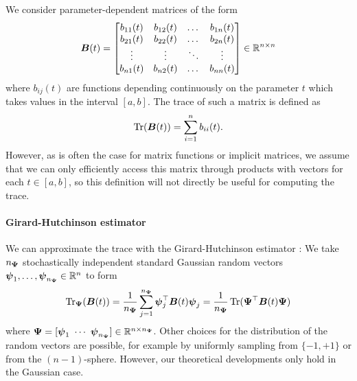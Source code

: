 \documentclass[12pt]{article}
\begin{document}
We consider parameter-dependent matrices of the form
\begin{equation}
    \boldsymbol{B}(t) = \begin{bmatrix}
        b_{11}(t) & b_{12}(t) & \dots & b_{1n}(t) \\
        b_{21}(t) & b_{22}(t) & \dots & b_{2n}(t) \\
        \vdots & \vdots & \ddots & \vdots \\
        b_{n1}(t) & b_{n2}(t) & \dots & b_{nn}(t) \\
    \end{bmatrix} \in \mathbb{R}^{n \times n}
\end{equation}
where $b_{ij}(t)$ are functions depending continuously on the parameter $t$ which takes values in the interval $[a,b]$. The trace of such a matrix is defined as
\begin{equation}
    \operatorname{Tr}(\boldsymbol{B}(t)) = \sum_{i=1}^{n} b_{ii}(t).
    \label{equ:definition-trace}
\end{equation}
However, as is often the case for matrix functions or implicit matrices, we assume that we can only efficiently access this matrix through products with vectors for each $t \in [a, b]$, so this definition will not directly be useful for computing the trace.

\paragraph{Girard-Hutchinson estimator} We can approximate the trace with the Girard-Hutchinson estimator \cite{girard-1989-fast-montecarlo,hutchinson-1990-stochastic-estimator}: We take $n_{\boldsymbol{\Psi}}$ stochastically independent standard Gaussian random vectors $\boldsymbol{\psi}_1,\dots, \boldsymbol{\psi}_{n_{\boldsymbol{\Psi}}} \in \mathbb{R}^{n}$ to form
\begin{equation}
    \operatorname{Tr}_{\boldsymbol{\Psi}}(\boldsymbol{B}(t))
    = \frac{1}{n_{\boldsymbol{\Psi}}} \sum_{j=1}^{n_{\boldsymbol{\Psi}}} \boldsymbol{\psi}_j^{\top} \boldsymbol{B}(t) \boldsymbol{\psi}_j
    = \frac{1}{n_{\boldsymbol{\Psi}}} \operatorname{Tr}( \boldsymbol{\Psi}^{\top} \boldsymbol{B}(t) \boldsymbol{\Psi})
    \label{equ:hutchinson-trace-estimator}
\end{equation}
where $\boldsymbol{\Psi} = [\boldsymbol{\psi}_1 ~ \cdots ~ \boldsymbol{\psi}_{n_{\boldsymbol{\Psi}}}] \in \mathbb{R}^{n \times n_{\boldsymbol{\Psi}}}$. Other choices for the distribution of the random vectors are possible, for example by uniformly sampling from $\{-1, +1\}$ or from the $(n-1)$-sphere. However, our theoretical developments only hold in the Gaussian case.
\end{document}
